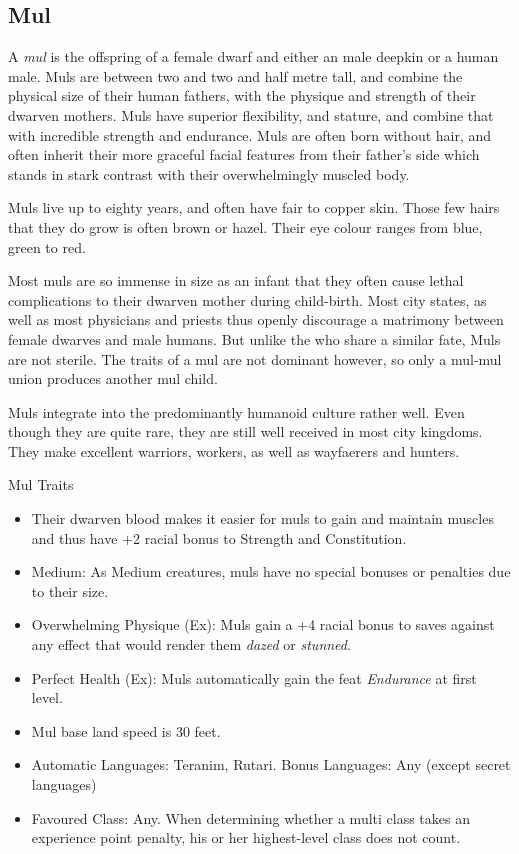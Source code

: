 \subsection{Mul}
\label{sec:Mul}

A \emph{mul} is the offspring of a female dwarf and either an male deepkin or
a human male. Muls are between two and two and half metre tall, and combine
the physical size of their human fathers, with the physique and strength of
their dwarven mothers. Muls have superior flexibility, and stature, and
combine that with incredible strength and endurance. Muls are often born
without hair, and often inherit their more graceful facial features from their
father's side which stands in stark contrast with their overwhelmingly muscled
body.

Muls live up to eighty years, and often have fair to copper skin. Those few
hairs that they do grow is often brown or hazel. Their eye colour ranges from
blue, green to red.

Most muls are so immense in size as an infant that they often cause lethal
complications to their dwarven mother during child-birth. Most city states, as
well as most physicians and priests thus openly discourage a matrimony between
female dwarves and male humans. But unlike the  who
share a similar fate, Muls are not sterile. The traits of a mul are not
dominant however, so only a mul-mul union produces another mul child.

Muls integrate into the predominantly humanoid culture rather well. Even though
they are quite rare, they are still well received in most city kingdoms. They
make excellent warriors, workers, as well as wayfaerers and hunters.

\begin{35e}{Mul Traits}
  \begin{itemize}[noitemsep]
  \item Their dwarven blood makes it easier for muls to gain and maintain
    muscles and thus have +2 racial bonus to Strength and Constitution.
  \item Medium: As Medium creatures, muls have no special bonuses or penalties
    due to their size.
  \item Overwhelming Physique (Ex): Muls gain a +4 racial bonus to saves against
    any effect that would render them \emph{dazed} or \emph{stunned}.
  \item Perfect Health (Ex): Muls automatically gain the feat \emph{Endurance}
    at first level.
  \item Mul base land speed is 30 feet.
  \item Automatic Languages: Teranim, Rutari. Bonus Languages: Any (except
    secret languages)
  \item Favoured Class: Any. When determining whether a multi class takes an
    experience point penalty, his or her highest-level class does not count.
  \end{itemize}
\end{35e}
